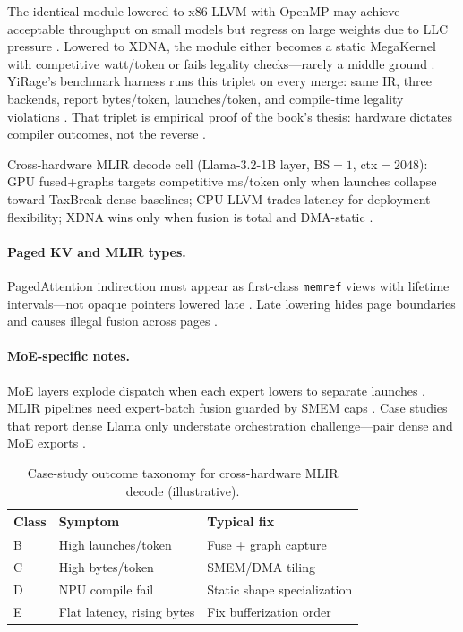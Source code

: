 The identical module lowered to x86 LLVM with OpenMP may achieve acceptable throughput on small models but regress on large weights due to LLC pressure \citep{dlbook}. Lowered to XDNA, the module either becomes a static MegaKernel with competitive watt/token or fails legality checks---rarely a middle ground \citep{amd2024xdna,amd2024aie}. YiRage's benchmark harness runs this triplet on every merge: same IR, three backends, report bytes/token, launches/token, and compile-time legality violations \citep{yirage2026}. That triplet is empirical proof of the book's thesis: hardware dictates compiler outcomes, not the reverse \citep{chen2020compilerbasedhardw}.

\begin{example}
Cross-hardware MLIR decode cell (Llama-3.2-1B layer, BS${=}1$, ctx${=}2048$): GPU fused+graphs targets competitive ms/token only when launches collapse toward TaxBreak dense baselines; CPU LLVM trades latency for deployment flexibility; XDNA wins only when fusion is total and DMA-static \citep{taxbreak2026,memoryfloor2026,yirage2026}.
\end{example}

\paragraph{Paged KV and MLIR types.} PagedAttention indirection must appear as first-class \texttt{memref} views with lifetime intervals---not opaque pointers lowered late \citep{kwon2023vllm,yirage2026}. Late lowering hides page boundaries and causes illegal fusion across pages \citep{dao2022flashattention,memoryfloor2026}.

\paragraph{MoE-specific notes.} MoE layers explode dispatch when each expert lowers to separate launches \citep{taxbreak2026,liu2024deepseekv3}. MLIR pipelines need expert-batch fusion guarded by SMEM caps \citep{yirage2026}. Case studies that report dense Llama only understate orchestration challenge---pair dense and MoE exports \citep{patel2025llminference,taxbreak2026}.

\begin{table}[t]
\centering
\caption{Case-study outcome taxonomy for cross-hardware MLIR decode (illustrative).}
\label{tab:mlir_case_taxonomy}
\begin{tabular}{lll}
\toprule
\textbf{Class} & \textbf{Symptom} & \textbf{Typical fix} \\
\midrule
B & High launches/token & Fuse + graph capture \\
C & High bytes/token & SMEM/DMA tiling \\
D & NPU compile fail & Static shape specialization \\
E & Flat latency, rising bytes & Fix bufferization order \\
\bottomrule
\end{tabular}
\end{table}


